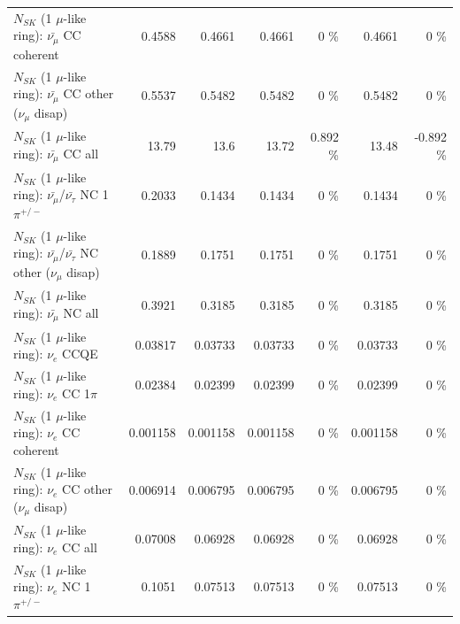 \begin{table}
\begin{tabular}{| l | r | r | r  r | r  r |}
                       $N_{SK}$ (1 $\mu$-like ring): $\bar{\nu_\mu}$ CC coherent &          0.4588 &          0.4661 &          0.4661 &        0 \%  &          0.4661 &        0 \%  \\ 
        $N_{SK}$ (1 $\mu$-like ring): $\bar{\nu_\mu}$ CC other ($\nu_\mu$ disap) &          0.5537 &          0.5482 &          0.5482 &        0 \%  &          0.5482 &        0 \%  \\ 
                          $N_{SK}$ (1 $\mu$-like ring): $\bar{\nu_{\mu}}$ CC all &           13.79 &            13.6 &           13.72 &    0.892 \%  &           13.48 &   -0.892 \%  \\ 
\hline
  $N_{SK}$ (1 $\mu$-like ring): $\bar{\nu_\mu}$/$\bar{\nu_\tau}$ NC 1$\pi^{+/-}$ &          0.2033 &          0.1434 &          0.1434 &        0 \%  &          0.1434 &        0 \%  \\ 
$N_{SK}$ (1 $\mu$-like ring): $\bar{\nu_\mu}$/$\bar{\nu_\tau}$ NC other ($\nu_\mu$ disap) &          0.1889 &          0.1751 &          0.1751 &        0 \%  &          0.1751 &        0 \%  \\ 
                          $N_{SK}$ (1 $\mu$-like ring): $\bar{\nu_{\mu}}$ NC all &          0.3921 &          0.3185 &          0.3185 &        0 \%  &          0.3185 &        0 \%  \\ 
\hline
\hline
\hline
                                      $N_{SK}$ (1 $\mu$-like ring): $\nu_e$ CCQE &         0.03817 &         0.03733 &         0.03733 &        0 \%  &         0.03733 &        0 \%  \\ 
                                 $N_{SK}$ (1 $\mu$-like ring): $\nu_e$ CC 1$\pi$ &         0.02384 &         0.02399 &         0.02399 &        0 \%  &         0.02399 &        0 \%  \\ 
                               $N_{SK}$ (1 $\mu$-like ring): $\nu_e$ CC coherent &        0.001158 &        0.001158 &        0.001158 &        0 \%  &        0.001158 &        0 \%  \\ 
                $N_{SK}$ (1 $\mu$-like ring): $\nu_e$ CC other ($\nu_\mu$ disap) &        0.006914 &        0.006795 &        0.006795 &        0 \%  &        0.006795 &        0 \%  \\ 
                                  $N_{SK}$ (1 $\mu$-like ring): $\nu_{e}$ CC all &         0.07008 &         0.06928 &         0.06928 &        0 \%  &         0.06928 &        0 \%  \\ 
\hline
                           $N_{SK}$ (1 $\mu$-like ring): $\nu_e$ NC 1$\pi^{+/-}$ &          0.1051 &         0.07513 &         0.07513 &        0 \%  &         0.07513 &        0 \%  \\ 

\end{tabular}
\end{table}
